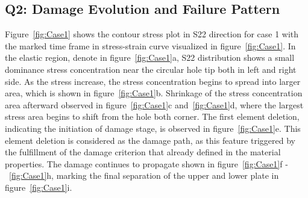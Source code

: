 \documentclass[12pt]{article}
\begin{document}
\subsection*{Q2: Damage Evolution and Failure Pattern}

\vspace{1em}

\vspace{1em}

\hspace{1em} Figure~\ref{fig:Case1} shows the contour stress plot in S22 direction for case 1 with the marked time frame in
stress-strain curve visualized in figure~\ref{fig:Case1}. In the elastic region, denote in figure~\ref{fig:Case1}a,
S22 distribution shows a small dominance stress concentration near the circular hole tip both in left and right side. As the stress increase, the 
stress concentration begins to spread into larger area, which is shown in figure~\ref{fig:Case1}b. Shrinkage of the stress concentration
area afterward observed in figure~\ref{fig:Case1}c and~\ref{fig:Case1}d, where the largest stress area begins to shift from
the hole both corner. The first element deletion, indicating the initiation of damage stage, is observed in figure~\ref{fig:Case1}e. This element deletion
is considered as the damage path, as this feature triggered by the fulfillment of the damage criterion that already defined in the material properties. The damage 
continues to propagate shown in figure~\ref{fig:Case1}f -~\ref{fig:Case1}h, marking the final separation of
the upper and lower plate in figure~\ref{fig:Case1}i.
\end{document}
